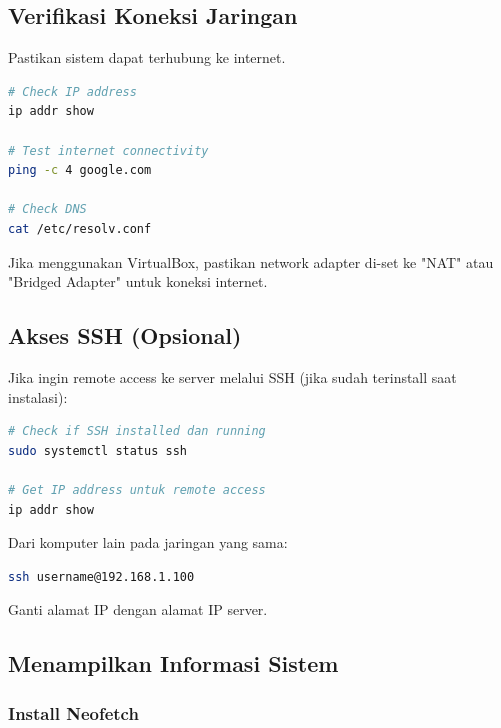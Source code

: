 \subsection{Verifikasi Koneksi Jaringan}

Pastikan sistem dapat terhubung ke internet.

\begin{lstlisting}[language=bash, caption={Check network status}]
# Check IP address
ip addr show

# Test internet connectivity
ping -c 4 google.com

# Check DNS
cat /etc/resolv.conf
\end{lstlisting}

\begin{tipbox}
Jika menggunakan VirtualBox, pastikan network adapter di-set ke "NAT" atau "Bridged Adapter" untuk koneksi internet.
\end{tipbox}

\subsection{Akses SSH (Opsional)}

Jika ingin remote access ke server melalui SSH (jika sudah terinstall saat instalasi):

\begin{lstlisting}[language=bash, caption={Check SSH status}]
# Check if SSH installed dan running
sudo systemctl status ssh

# Get IP address untuk remote access
ip addr show
\end{lstlisting}

\begin{examplebox}
Dari komputer lain pada jaringan yang sama:
\begin{lstlisting}[language=bash]
ssh username@192.168.1.100
\end{lstlisting}

Ganti alamat IP dengan alamat IP server.
\end{examplebox}

\subsection{Menampilkan Informasi Sistem}

\subsubsection{Install Neofetch}

